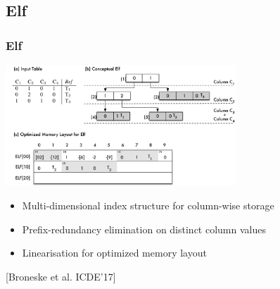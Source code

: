\documentclass{beamer}
\begin{document}
\begin{frame}
\end{frame}

\subsection{Elf}
\begin{frame}
\frametitle{Elf}
\begin{center}
\includegraphics[width=0.65\textwidth]{img/elf.pdf}
\end{center}
\begin{itemize}[label=\textbullet,leftmargin=1em]
\item Multi-dimensional index structure for column-wise storage
\item Prefix-redundancy elimination on distinct column values
\item Linearisation for optimized memory layout
\end{itemize}
\begin{center}
\tiny [Broneske et al. ICDE’17]
\end{center}
\end{frame}
\end{document}
